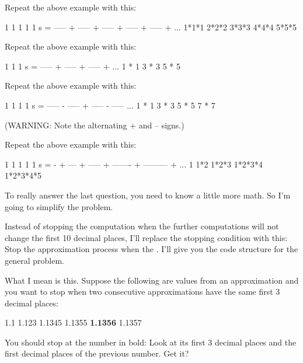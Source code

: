 \begin{ex}
Repeat the above example with this:
\begin{console}
      1       1       1       1       1
s = ----- + ----- + ----- + ----- + ----- + ...
    1*1*1   2*2*2   3*3*3   4*4*4   5*5*5
\end{console}
\end{ex}
\begin{ex}
Repeat the above example with this:
\begin{console}
      1       1       1 
s = ----- + ----- + ----- + ...
    1 * 1   3 * 3   5 * 5
\end{console}
\end{ex}
\begin{ex}
Repeat the above example with this:
\begin{console}
      1       1       1       1
s = ----- - ----- + ----- - ----- ...
    1 * 1   3 * 3   5 * 5   7 * 7
\end{console}
(WARNING: Note the alternating + and -- signs.)
\end{ex}
\begin{ex}
Repeat the above example with this:
\begin{console}
    1    1      1        1          1
s = - + --- + ----- + ------- + --------- + ...
    1   1*2   1*2*3   1*2*3*4   1*2*3*4*5
\end{console}
\end{ex}

\newpage{}

To really answer the last question, you need to know a little more math.
So I'm going to simplify the problem.

Instead of stopping the computation when the further computations will
not change the first 10 decimal places, I'll replace the
stopping condition with this: Stop the approximation process when the
. I'll give you the code structure for the general
problem.

What I mean is this. Suppose the following are values from an
approximation and you want to stop when two consecutive approximations
have the same first 3 decimal places:
\begin{center}
1.1 1.123 1.1345 1.1355 \textbf{1.1356} 1.1357
\end{center}
You should stop at the number in bold: Look at its first 3 decimal
places and the first decimal places of the previous number. Get it?


